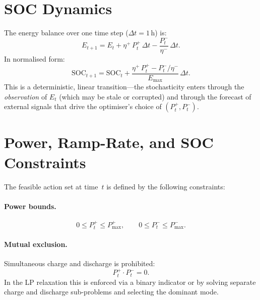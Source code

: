 \section{SOC Dynamics}
\label{sec:soc-dynamics}

The energy balance over one time step ($\Delta t = 1$\,h) is:
\begin{equation}
\label{eq:soc-dynamics-battery}
  E_{t+1} = E_t + \eta^{+}\,P_t^{+}\,\Delta t
                 - \frac{P_t^{-}}{\eta^{-}}\,\Delta t.
\end{equation}
In normalised form:
\begin{equation}
\label{eq:soc-normalised}
  \mathrm{SOC}_{t+1} = \mathrm{SOC}_t
    + \frac{\eta^{+}\,P_t^{+} - P_t^{-}/\eta^{-}}{E_{\max}}\,\Delta t.
\end{equation}
This is a deterministic, linear transition---the stochasticity enters through
the \emph{observation} of $E_t$ (which may be stale or corrupted) and through
the forecast of external signals that drive the optimiser's choice of
$(P_t^{+}, P_t^{-})$.

\section{Power, Ramp-Rate, and SOC Constraints}
\label{sec:constraints}

The feasible action set at time~$t$ is defined by the following constraints:

\paragraph{Power bounds.}
\begin{equation}
\label{eq:power-bounds}
  0 \le P_t^{+} \le P_{\max}^{+}, \qquad
  0 \le P_t^{-} \le P_{\max}^{-}.
\end{equation}

\paragraph{Mutual exclusion.}
Simultaneous charge and discharge is prohibited:
\begin{equation}
\label{eq:mutual-exclusion}
  P_t^{+} \cdot P_t^{-} = 0.
\end{equation}
In the LP relaxation this is enforced via a binary indicator or by solving
separate charge and discharge sub-problems and selecting the dominant mode.

